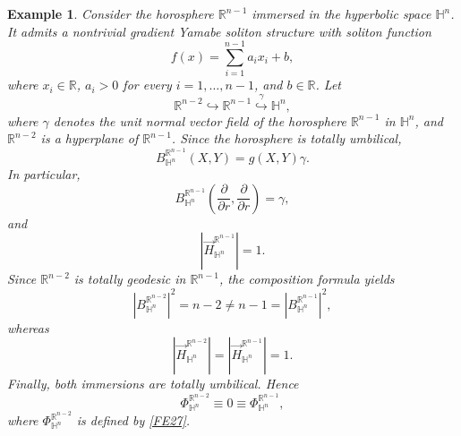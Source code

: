 \documentclass[11pt]{amsart}
\newtheorem{example}[theorem]{Example}
\numberwithin{equation}{section}
\begin{document}
\begin{example}
Consider the horosphere $\mathbb{R}^{n-1}$ immersed in the hyperbolic space
$\mathbb{H}^n$. It admits a nontrivial gradient Yamabe soliton structure with
soliton function
\[
f(x)=\sum_{i=1}^{n-1}a_i x_i+b,
\]
where $x_i\in\mathbb{R}$, $a_i>0$ for every
$i=1,\ldots,n-1$, and $b\in\mathbb{R}$.
Let
\[
\mathbb{R}^{n-2}\hookrightarrow
\mathbb{R}^{n-1}
\overset{\gamma}{\hookrightarrow}
\mathbb{H}^n,
\]
where $\gamma$ denotes the unit normal vector field of the horosphere
$\mathbb{R}^{n-1}$ in $\mathbb{H}^n$, and
$\mathbb{R}^{n-2}$ is a hyperplane of $\mathbb{R}^{n-1}$.
Since the horosphere is totally umbilical,
\[
B^{\mathbb{R}^{n-1}}_{\mathbb{H}^n}(X,Y)
=g(X,Y)\gamma.
\]
In particular,
\[
B^{\mathbb{R}^{n-1}}_{\mathbb{H}^n}
\left(\frac{\partial}{\partial r},
\frac{\partial}{\partial r}\right)
=\gamma,
\]
and
\[
|\vec{H}^{\mathbb{R}^{n-1}}_{\mathbb{H}^n}|=1.
\]
Since $\mathbb{R}^{n-2}$ is totally geodesic in
$\mathbb{R}^{n-1}$, the composition formula yields
\[
\left|B^{\mathbb{R}^{n-2}}_{\mathbb{H}^n}\right|^2
=n-2
\neq
n-1
=
\left|B^{\mathbb{R}^{n-1}}_{\mathbb{H}^n}\right|^2,
\]
whereas
\[
|\vec{H}^{\mathbb{R}^{n-2}}_{\mathbb{H}^n}|
=
|\vec{H}^{\mathbb{R}^{n-1}}_{\mathbb{H}^n}|
=1.
\]
Finally, both immersions are totally umbilical. Hence
\[
\Phi^{\mathbb{R}^{n-2}}_{\mathbb{H}^n}\equiv0 \equiv \Phi^{\mathbb{R}^{n-1}}_{\mathbb{H}^n},
\]
where $\Phi^{\mathbb{R}^{n-2}}_{\mathbb{H}^n}$ is defined by \eqref{FE27}.
\end{example}
\end{document}
